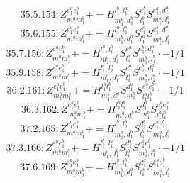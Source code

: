 \documentclass[letterpaper,10pt,fleqn,leqno,onecolumn]{article}
\begin{document}
\begin{equation} \;\;\;\;\;\;  35.5.154: Z^{e_{1}^{a}e_{1}^{b}}_{m_{1}^{a}m_{1}^{b}}+=H^{l_{1}^{b},l_{1}^{a}}_{m_{1}^{a},d_{1}^{b}}S^{e_{1}^{b}}_{l_{1}^{b}}S^{e_{1}^{a},d_{1}^{b}}_{m_{1}^{b},l_{1}^{a}} \end{equation}
\begin{equation} \;\;\;\;\;\;  35.6.155: Z^{e_{1}^{a}e_{1}^{b}}_{m_{1}^{a}m_{1}^{b}}+=H^{l_{1}^{a},l_{1}^{b}}_{m_{1}^{b},d_{1}^{a}}S^{e_{1}^{a}}_{l_{1}^{a}}S^{e_{1}^{b},d_{1}^{a}}_{m_{1}^{a},l_{1}^{b}} \end{equation}
\begin{equation} \;\;\;\;\;\;  35.7.156: Z^{e_{1}^{a}e_{1}^{b}}_{m_{1}^{a}m_{1}^{b}}+=H^{l_{1}^{a},l_{1}^{b}}_{m_{1}^{a},d_{1}^{b}}S^{e_{1}^{a}}_{l_{1}^{a}}S^{e_{1}^{b},d_{1}^{b}}_{m_{1}^{b},l_{1}^{b}}\cdot -1/1 \end{equation}
\begin{equation} \;\;\;\;\;\;  35.9.158: Z^{e_{1}^{a}e_{1}^{b}}_{m_{1}^{a}m_{1}^{b}}+=H^{l_{1}^{a},l_{2}^{a}}_{m_{1}^{a},d_{1}^{a}}S^{e_{1}^{a}}_{l_{1}^{a}}S^{e_{1}^{b},d_{1}^{a}}_{m_{1}^{b},l_{2}^{a}}\cdot -1/1 \end{equation}
\begin{equation} \;\;\;\;\;\;  36.2.161: Z^{e_{1}^{a}e_{1}^{b}}_{m_{1}^{a}m_{1}^{b}}+=H^{l_{1}^{a}l_{1}^{b}}_{m_{1}^{b},d_{1}^{a}}S^{d_{1}^{a}}_{m_{1}^{a}}S^{e_{1}^{a}e_{1}^{b}}_{l_{1}^{a}l_{1}^{b}}\cdot -1/1 \end{equation}
\begin{equation} \;\;\;\;\;\;  36.3.162: Z^{e_{1}^{a}e_{1}^{b}}_{m_{1}^{a}m_{1}^{b}}+=H^{l_{1}^{a}l_{1}^{b}}_{m_{1}^{a},d_{1}^{b}}S^{d_{1}^{b}}_{m_{1}^{b}}S^{e_{1}^{a}e_{1}^{b}}_{l_{1}^{a}l_{1}^{b}} \end{equation}
\begin{equation} \;\;\;\;\;\;  37.2.165: Z^{e_{1}^{a}e_{1}^{b}}_{m_{1}^{a}m_{1}^{b}}+=H^{l_{1}^{b},l_{2}^{b}}_{m_{1}^{b},d_{1}^{b}}S^{d_{1}^{b}}_{l_{1}^{b}}S^{e_{1}^{a}e_{1}^{b}}_{m_{1}^{a},l_{2}^{b}} \end{equation}
\begin{equation} \;\;\;\;\;\;  37.3.166: Z^{e_{1}^{a}e_{1}^{b}}_{m_{1}^{a}m_{1}^{b}}+=H^{l_{1}^{b},l_{1}^{a}}_{m_{1}^{a},d_{1}^{b}}S^{d_{1}^{b}}_{l_{1}^{b}}S^{e_{1}^{a}e_{1}^{b}}_{m_{1}^{b},l_{1}^{a}}\cdot -1/1 \end{equation}
\begin{equation} \;\;\;\;\;\;  37.6.169: Z^{e_{1}^{a}e_{1}^{b}}_{m_{1}^{a}m_{1}^{b}}+=H^{l_{1}^{a},l_{1}^{b}}_{m_{1}^{b},d_{1}^{a}}S^{d_{1}^{a}}_{l_{1}^{a}}S^{e_{1}^{a}e_{1}^{b}}_{m_{1}^{a},l_{1}^{b}} \end{equation}
\end{document}
